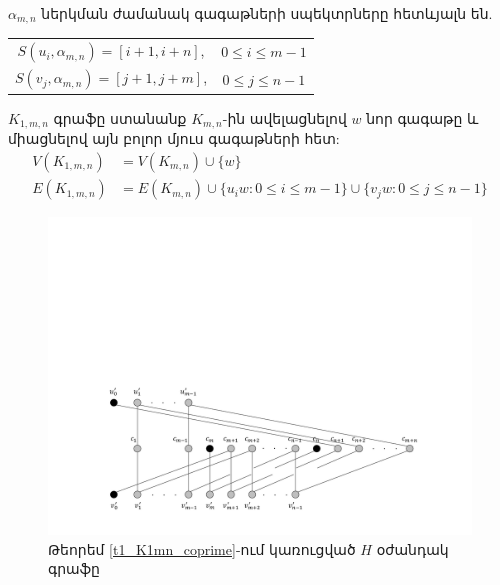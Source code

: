 $\alpha_{m,n}$ ներկման ժամանակ գագաթների սպեկտրները հետևյալն են.
\begin{center}
\begin{tabular}{cc}
$ S(u_i, \alpha_{m,n}) = [i+1, i+n ]$, & $0 \leq i \leq m-1$ \\
$ S(v_j, \alpha_{m,n}) = [j+1, j+m ]$, & $0 \leq j \leq n-1$
\end{tabular}
\end{center}

$K_{1,m,n}$ գրաֆը ստանանք $K_{m,n}$-ին ավելացնելով $w$ նոր գագաթը և միացնելով այն բոլոր մյուս գագաթների հետ:
\begin{align*}
V(K_{1,m,n}) & = V(K_{m,n}) \cup \{w\} \\
E(K_{1,m,n}) & = E(K_{m,n}) \cup \{u_iw : 0 \leq i \leq m-1 \} \cup \{v_jw : 0 \leq j \leq n-1 \}
\end{align*}

\begin{figure}[t]
\centering
\includegraphics[width=\textwidth]{figures/tripartite_auxillary.pdf}
\caption{Թեորեմ \ref{t1_K1mn_coprime}-ում կառուցված $H$ օժանդակ գրաֆը}
\label{graphH}
\end{figure}

